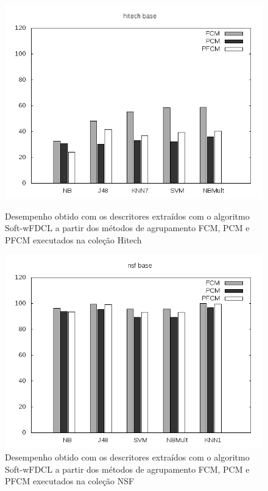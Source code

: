 \begin{figure}[!htp] \centering 
   \begin{minipage}{0.45\textwidth} 
     \centering
    \includegraphics[width=1.0\columnwidth]{assets/pfcm/hitech} 
    \caption{Desempenho obtido com os descritores extraídos com o algoritmo Soft-wFDCL a partir dos
      métodos de agrupamento FCM,
    PCM e PFCM executados na coleção Hitech} 
  \label{fig:pfcmhitech}
  \end{minipage}\hfill 
  \begin{minipage}{0.45\textwidth} \centering
    \includegraphics[width=1.0\columnwidth]{assets/pfcm/nsf} 
    \caption{Desempenho obtido com os descritores extraídos com o algoritmo Soft-wFDCL a partir dos
      métodos de agrupamento FCM,
    PCM e PFCM executados na coleção NSF} 
     \label{fig:pfcmnsf} 
   \end{minipage} 
\end{figure}

